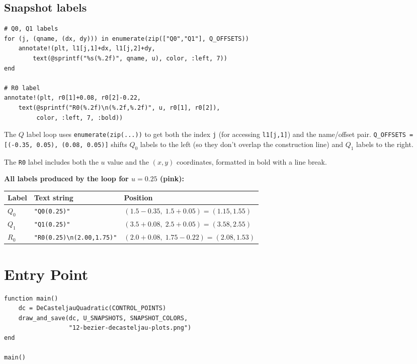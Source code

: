 \documentclass[12pt, a4paper]{article}
\newcommand{\cd}[1]{\texttt{#1}}
\begin{document}
\subsection{Snapshot labels}

\begin{verbatim}
# Q0, Q1 labels
for (j, (qname, (dx, dy))) in enumerate(zip(["Q0","Q1"], Q_OFFSETS))
    annotate!(plt, l1[j,1]+dx, l1[j,2]+dy,
        text(@sprintf("%s(%.2f)", qname, u), color, :left, 7))
end

# R0 label
annotate!(plt, r0[1]+0.08, r0[2]-0.22,
    text(@sprintf("R0(%.2f)\n(%.2f,%.2f)", u, r0[1], r0[2]),
         color, :left, 7, :bold))
\end{verbatim}

The $Q$ label loop uses \cd{enumerate(zip(...))} to get
both the index \cd{j} (for accessing \cd{l1[j,1]}) and
the name/offset pair.
\cd{Q\_OFFSETS = [(-0.35, 0.05), (0.08, 0.05)]}
shifts $Q_0$ labels to the left (so they don't overlap
the construction line) and $Q_1$ labels to the right.

The \cd{R0} label includes both the $u$ value and the
$(x, y)$ coordinates, formatted in bold with a line break.

\begin{examplebox}
\textbf{All labels produced by the loop for $u = 0.25$ (pink):}

\medskip
\begin{tabular}{lll}
\toprule
Label & Text string & Position \\
\midrule
$Q_0$ & \cd{"Q0(0.25)"} & $(1.5-0.35,\; 1.5+0.05) = (1.15, 1.55)$ \\
$Q_1$ & \cd{"Q1(0.25)"} & $(3.5+0.08,\; 2.5+0.05) = (3.58, 2.55)$ \\
$R_0$ & \cd{"R0(0.25)\textbackslash n(2.00,1.75)"} & $(2.0+0.08,\; 1.75-0.22) = (2.08, 1.53)$ \\
\bottomrule
\end{tabular}
\end{examplebox}


\section{Entry Point}

\begin{verbatim}
function main()
    dc = DeCasteljauQuadratic(CONTROL_POINTS)
    draw_and_save(dc, U_SNAPSHOTS, SNAPSHOT_COLORS,
                  "12-bezier-decasteljau-plots.png")
end

main()
\end{verbatim}
\end{document}
